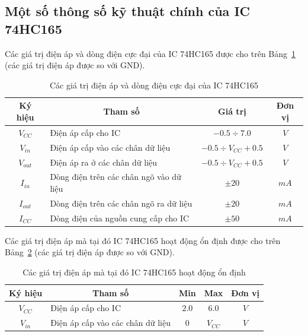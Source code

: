 \documentclass[12pt,a4paper]{article}
\newcommand{\tab}[1]{Bảng~#1}
\newcommand{\head}[1]{\textbf{#1}}
\begin{document}
\subsection{Một số thông số kỹ thuật chính của IC 74HC165}
    Các giá trị điện áp và dòng điện cực đại của IC 74HC165 được cho trên \tab{\ref{Tab:maximum_ratings}} (các giá trị điện áp được so với GND).
        \begin{table}[htp]
            \centering
            \caption{Các giá trị điện áp và dòng điện cực đại của IC 74HC165}
            \label{Tab:maximum_ratings}
            \begin{tabular}{|c|l|c|c|}
                \hline
                \head{Ký hiệu} & \multicolumn{1}{c|}{\head{Tham số}} & \head{Giá trị} & \head{Đơn vị} \\
                \hline
                $V_{CC}$ & Điện áp cấp cho IC & $-0.5 \div 7.0$ & $V$ \\
                \hline
                $V_{in}$ & Điện áp cấp vào các chân dữ liệu & $-0.5 \div V_{CC} + 0.5$ & $V$ \\
                \hline
                $V_{out}$ & Điện áp ra ở các chân dữ liệu & $-0.5 \div V_{CC} + 0.5$ & $V$ \\
                \hline
                $I_{in}$ & Dòng điện trên các chân ngõ vào dữ liệu & $\pm 20$ & $mA$ \\
                \hline
                $I_{out}$ & Dòng điện trên các chân ngõ ra dữ liệu & $\pm 20$ & $mA$ \\
                \hline
                $I_{CC}$ & Dòng điện của nguồn cung cấp cho IC & $\pm 50$ & $mA$ \\
                \hline
            \end{tabular}
        \end{table}

    Các giá trị điện áp mà tại đó IC 74HC165 hoạt động ổn định được cho trên \tab{\ref{Tab:recommended_operating_conditions}} (các giá trị điện áp được so với GND).
        \begin{table}[!htp]
            \centering
            \caption{Các giá trị điện áp mà tại đó IC 74HC165 hoạt động ổn định}
            \label{Tab:recommended_operating_conditions}
            \begin{tabular}{|c|l|c|c|c|}
                \hline
                \head{Ký hiệu} & \multicolumn{1}{c|}{\head{Tham số}} & \head{Min} & \head{Max} & \head{Đơn vị} \\
                \hline
                $V_{CC}$ & Điện áp cấp cho IC & $2.0$ & $6.0$ & $V$ \\
                \hline
                $V_{in}$ & Điện áp cấp vào các chân dữ liệu & $0$ & $V_{CC}$ & $V$ \\
                \hline
            \end{tabular}
        \end{table}
\end{document}

